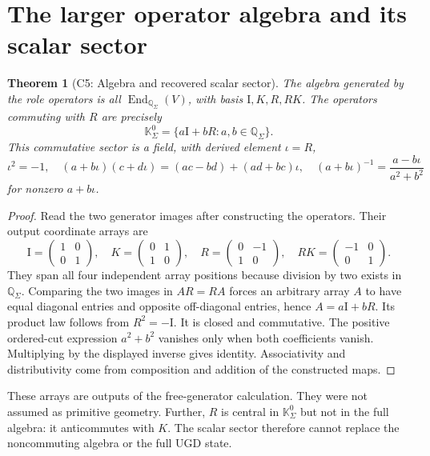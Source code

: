 \documentclass[11pt]{article}
\newtheorem{theorem}{Theorem}[section]
\newcommand{\Qcut}{\mathbb Q_\Sigma}
\newcommand{\Kcut}{\mathbb K_\Sigma}
\newcommand{\Id}{\mathrm I}
\newcommand{\End}{\operatorname{End}}
\begin{document}
\section{The larger operator algebra and its scalar sector}
\label{sec:scalars}
\begin{theorem}[C5: Algebra and recovered scalar sector]
\label{thm:scalars}
The algebra generated by the role operators is all $\End_{\Qcut}(V)$, with
basis $\Id,K,R,RK$. The operators commuting with $R$ are precisely
\[
\Kcut^0=\{a\Id+bR:a,b\in\Qcut\}.
\]
This commutative sector is a field, with derived element $\iota=R$,
\[
\iota^2=-1,\quad
(a+b\iota)(c+d\iota)=(ac-bd)+(ad+bc)\iota,
\quad
(a+b\iota)^{-1}=\frac{a-b\iota}{a^2+b^2}
\]
for nonzero $a+b\iota$.
\end{theorem}
\begin{proof}
Read the two generator images after constructing the operators. Their output
coordinate arrays are
\[
\Id=\begin{pmatrix}1&0\\0&1\end{pmatrix},\quad
K=\begin{pmatrix}0&1\\1&0\end{pmatrix},\quad
R=\begin{pmatrix}0&-1\\1&0\end{pmatrix},\quad
RK=\begin{pmatrix}-1&0\\0&1\end{pmatrix}.
\]
They span all four independent array positions because division by two exists
in $\Qcut$. Comparing the two images in $AR=RA$ forces an arbitrary array
$A$ to have equal diagonal entries and opposite off-diagonal entries, hence
$A=a\Id+bR$. Its product law follows from $R^2=-\Id$. It is closed and
commutative. The positive ordered-cut expression $a^2+b^2$ vanishes only
when both coefficients vanish. Multiplying by the displayed inverse gives
identity. Associativity and distributivity come from composition and addition
of the constructed maps.
\end{proof}
These arrays are outputs of the free-generator calculation. They were not
assumed as primitive geometry. Further, $R$ is central in $\Kcut^0$ but not
in the full algebra: it anticommutes with $K$. The scalar sector therefore
cannot replace the noncommuting algebra or the full UGD state.
\end{document}
